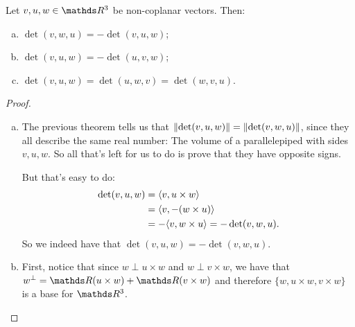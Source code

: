 \begin{lemma}
	Let $v,u,w\in \R^3$ be non-coplanar vectors. Then:
	\begin{enumerate}[a)]
		\item $\det(v,w,u)=-\det(v,u,w)$;
		\item $\det(v,u,w)=-\det(u,v,w)$;
		\item $\det(v,u,w)=\det(u,w,v)=\det(w,v,u)$.
	\end{enumerate}
\end{lemma}
\begin{proof}
	\begin{enumerate}[a)]
		\item The previous theorem tells us that $\lVert\det(v,u,w)\rVert=\lVert\det(v,w,u)\rVert$, since they all describe the same real number: The volume of a parallelepiped with sides $v,u,w$. So all that's left for us to do is prove that they have opposite signs.
		
		But that's easy to do:
		\begin{align*}
			\det(v,u,w)&=\langle v,u\times w\rangle\\
			&=\langle v,-(w\times u)\rangle\\
			&=-\langle v,w\times u\rangle=-\det(v,w,u).
		\end{align*}So we indeed have that $\det(v,u,w)=-\det(v,w,u)$.
		
		\item First, notice that since $w\perp u\times w$ and $w\perp v\times w$, we have that $w^\perp=\R(u\times w)+\R(v\times w)$ and therefore $\{w,u\times w,v\times w\}$ is a base for $\R^3$.
	\end{enumerate}
\end{proof}